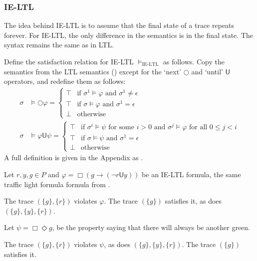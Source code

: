 \documentclass[a4paper]{article}
\newcommand{\U}{\mathsf{U}}
\newcommand{\tand}{\text{ and }}
\newcommand{\fsome}{\text{ for some }}
\newcommand{\fall}{\text{ for all }}
\begin{document}
\subsubsection{IE-LTL} The idea behind IE-LTL is to assume that the final state of a trace repeats forever. For IE-LTL, the only difference in the semantics is in the final state. The syntax remains the same as in LTL.
\begin{defn}\label{ieltlsem}

  Define the satisfaction relation for IE-LTL $\vDash_{\text{IE-LTL}}$ as follows. Copy the semantics from the LTL semantics () except for the `next' $\bigcirc$ and `until' $\U$ operators, and redefine them as follows:
  \begin{align*}
    \sigma &\vDash \bigcirc \varphi =
      \begin{cases}
        \top &\text{if } \sigma^1 \vDash \varphi \tand \sigma^1 \ne \epsilon\\
        \top &\text{if } \sigma \vDash \varphi \tand \sigma^1 = \epsilon\\
        \bot &\text{otherwise}
      \end{cases}\\
    \sigma &\vDash \varphi \U \psi =
    \begin{cases}
      \top &\text{if } \sigma^i \vDash \psi \fsome i > 0 \tand \sigma^j \vDash \varphi \fall 0 \leq j < i\\
      \top &\text{if } \sigma \vDash \psi \tand \sigma^1 = \epsilon\\
      \bot &\text{otherwise}
    \end{cases}
  \end{align*}
  A full definition is given in the Appendix as .
\end{defn}

\begin{eg}\label{ieltleg}
  Let $r,y,g\in P$ and $\varphi = \Box (g \to (\neg r \U y))$ be an IE-LTL formula, the same traffic light formula formula from .

  The trace $(\{g\},\{r\})$ violates $\varphi$. The trace $(\{g\})$ satisfies it, as does $(\{g\},\{y\},\{r\})$.

  Let $\psi = \Box \Diamond g $, be the property saying that there will always be another green.

  The trace $(\{g\},\{r\})$ violates $\psi$, as does $(\{g\},\{y\},\{r\})$. The trace $(\{g\})$ satisfies it.

\end{eg}
\end{document}
